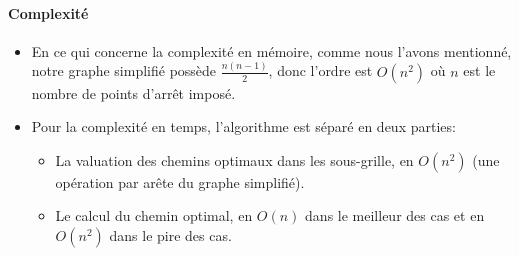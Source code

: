 \paragraph{Complexité}
\begin{itemize}
	\item En ce qui concerne la complexité en mémoire, comme nous l'avons mentionné, notre graphe simplifié possède $\frac{n(n-1)}{2}$, donc l'ordre est $O(n^2)$ où $n$ est le nombre de points d'arrêt imposé.\\
	\item Pour la complexité en temps, l'algorithme est séparé en deux parties:
	\begin{itemize}
			\item La valuation des chemins optimaux dans les sous-grille, en $O(n^2)$ (une opération par arête du graphe simplifié).
			\item Le calcul du chemin optimal, en $O(n)$ dans le meilleur des cas et en $O(n^2)$ dans le pire des cas.
	\end{itemize}
\end{itemize}
